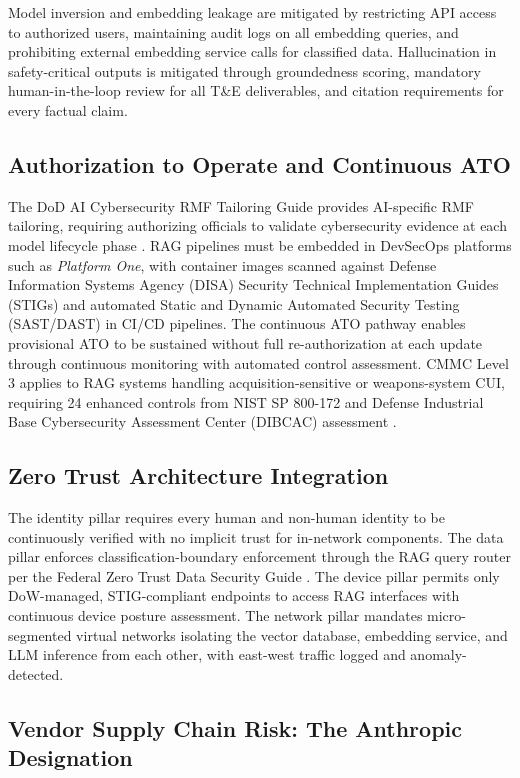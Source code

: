 \documentclass[12pt,letterpaper]{article}
\let\cite\parencite
\begin{document}
Model inversion and embedding leakage are mitigated by restricting API access to authorized users, maintaining audit logs on all embedding queries, and prohibiting external embedding service calls for classified data. Hallucination in safety-critical outputs is mitigated through groundedness scoring, mandatory human-in-the-loop review for all T\&E deliverables, and citation requirements for every factual claim.

\subsection{Authorization to Operate and Continuous ATO}

The DoD AI Cybersecurity RMF Tailoring Guide provides AI-specific RMF tailoring, requiring authorizing officials to validate cybersecurity evidence at each model lifecycle phase \cite{cdao_rmf2024}. RAG pipelines must be embedded in DevSecOps platforms such as \textit{Platform One}, with container images scanned against Defense Information Systems Agency (DISA) Security Technical Implementation Guides (STIGs) and automated Static and Dynamic Automated Security Testing (SAST/DAST) in CI/CD pipelines. The continuous ATO pathway enables provisional ATO to be sustained without full re-authorization at each update through continuous monitoring with automated control assessment. CMMC Level 3 applies to RAG systems handling acquisition-sensitive or weapons-system CUI, requiring 24 enhanced controls from NIST SP 800-172 and Defense Industrial Base Cybersecurity Assessment Center (DIBCAC) assessment \cite{wiley2025}.

\subsection{Zero Trust Architecture Integration}

The identity pillar requires every human and non-human identity to be continuously verified with no implicit trust for in-network components. The data pillar enforces classification-boundary enforcement through the RAG query router per the Federal Zero Trust Data Security Guide \cite{ciso2025}. The device pillar permits only DoW-managed, STIG-compliant endpoints to access RAG interfaces with continuous device posture assessment. The network pillar mandates micro-segmented virtual networks isolating the vector database, embedding service, and LLM inference from each other, with east-west traffic logged and anomaly-detected.

\subsection{Vendor Supply Chain Risk: The Anthropic Designation}
\end{document}
